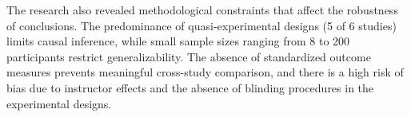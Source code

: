 \documentclass[
hf,
]{ceurart}
\begin{document}
The research also revealed methodological constraints that affect the robustness of conclusions. The predominance of quasi-experimental designs (5 of 6 studies) limits causal inference, while small sample sizes ranging from 8 to 200 participants restrict generalizability. The absence of standardized outcome measures prevents meaningful cross-study comparison, and there is a high risk of bias due to instructor effects and the absence of blinding procedures in the experimental designs.



\end{document}
